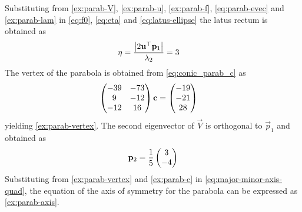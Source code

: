     Substituting from 
    \eqref{ex:parab-V},
    \eqref{ex:parab-u},
    \eqref{ex:parab-f},
	    \eqref{eq:parab-evec}
    and 
	 \eqref{ex:parab-lam}
 in \eqref{eq:f0},
      \eqref{eq:eta} and 
			\eqref{eq:latus-ellipse}
			the latus rectum is obtained as
    \begin{align}
	    \eta &=\frac{\left\vert2\mathbf{u}^{\top}\mathbf{p}_1\right\vert}{\lambda_2}
	    = 3
    \end{align}
    The vertex of the parabola is obtained from 
    \eqref{eq:conic_parab_c} as 
  \begin{align}
	  \begin{pmatrix}	  -39 & -73  \\9 & -12  \\-12 & 16 \end{pmatrix}\mathbf{c} &= 
	  \begin{pmatrix}  -19\\-21\\28\end{pmatrix}
	  \label{ex:parab-c}
    \end{align}	
    yielding
    \eqref{ex:parab-vertex}.
    The second eigenvector of $\vec{V}$ is orthogonal to $\vec{p}_1$ and obtained as 
    \begin{align}
 \mathbf{p}_2 = \frac{1}{5}\begin{pmatrix}3 \\ -4\end{pmatrix} 
    \end{align}
    Substituting from 
    \eqref{ex:parab-vertex}
and
	  \eqref{ex:parab-c}
    in 
	  \eqref{eq:major-minor-axis-quad}, the equation of the axis of symmetry for the parabola can be expressed as 
    \eqref{ex:parab-axis}.



